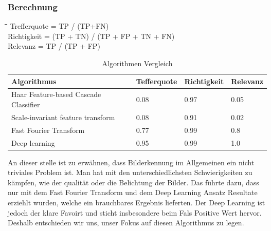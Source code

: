 \subsubsection{Berechnung}
\begin{tabbing}
    \hspace*{3cm}\=\hspace*{3cm}\=\hspace*{6cm}\= \kill
	Trefferquote \> = \> TP / (TP+FN)\\
	Richtigkeit \> = \> (TP + TN) / (TP + FP + TN + FN)\\
	Relevanz \> = \> TP / (TP + FP)\\
\end{tabbing}

\begin{table}[H]
    \begin{tabular}{|l|l|l|l|}
    \hline    
    \rowcolor{lightblue}
	Algorithmus & Tefferquote & Richtigkeit & Relevanz \\ \hline
	Haar Feature-based Cascade Classifier & 0.08 & 0.97 & 0.05 \\ \hline
	Scale-invariant feature transform & 0.08 & 0.91 & 0.02 \\ \hline
	Fast Fourier Transform & 0.77 & 0.99 & 0.8 \\ \hline
	Deep learning & 0.95 & 0.99 & 1.0 \\ \hline
    \end{tabular}
    \caption[Algorithmen Vergleich]{Algorithmen Vergleich}
\end{table}

An dieser stelle ist zu erwähnen, dass Bilderkennung im Allgemeinen ein nicht triviales Problem ist. Man hat mit den unterschiedlichsten Schwierigkeiten zu kämpfen, wie der qualität oder die Belichtung der Bilder. Das führte dazu, dass nur mit dem Fast Fourier Transform und dem Deep Learning Ansatz Resultate erziehlt wurden, welche ein brauchbares Ergebnis lieferten. Der Deep Learning ist jedoch der klare Favoirt und sticht insbesondere beim Fals Positive Wert hervor. Deshalb entschieden wir uns, unser Fokus auf diesen Algorithmus zu legen. 



